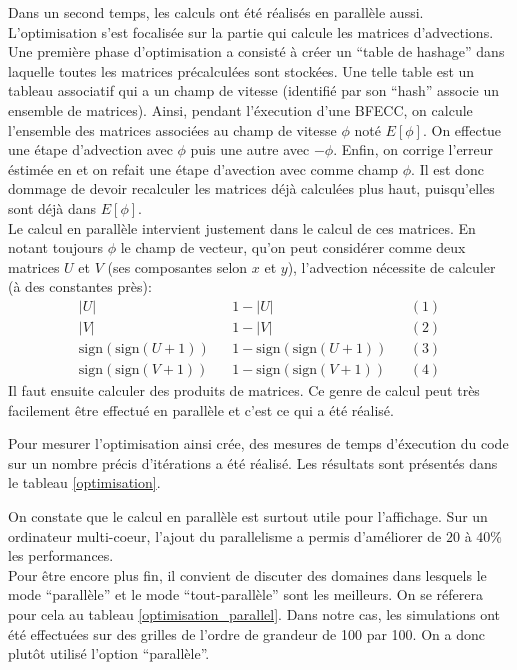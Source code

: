 Dans un second temps, les calculs ont été réalisés en parallèle
aussi. L'optimisation s'est focalisée sur la partie qui calcule les
matrices d'advections. Une première phase d'optimisation a consisté à
créer un ``table de hashage'' dans laquelle toutes les matrices
précalculées sont stockées. Une telle table est un tableau associatif
qui a un champ de vitesse (identifié par son ``hash'' associe un
ensemble de matrices). Ainsi, pendant l'éxecution d'une BFECC,
on calcule l'ensemble des matrices associées au champ de vitesse
$\phi$ noté $E[\phi]$. On effectue une étape d'advection avec $\phi$
puis une autre avec $-\phi$. Enfin, on corrige l'erreur éstimée en
et on refait une étape d'avection avec comme champ $\phi$. Il est donc
dommage de devoir recalculer les matrices déjà calculées plus haut,
puisqu'elles sont déjà dans $E[\phi]$.\\
Le calcul en parallèle intervient justement dans le calcul de ces
matrices. En notant toujours $\phi$ le champ de vecteur, qu'on peut
considérer comme deux matrices $U$ et $V$ (ses composantes selon $x$
et $y$), l'advection nécessite de calculer (à des constantes près): 
\begin{align*}
  \left| U \right | & &  1 - \left| U \right | & &(1)\\
  \left| V \right | & &  1 - \left| V \right | & &(2)\\
  \textrm{sign}\left( \textrm{sign}(U+1)\right) & &   1 -
  \textrm{sign}\left( \textrm{sign}(U+1)\right) & &(3)\\
  \textrm{sign}\left( \textrm{sign}(V+1)\right) & &   1 -
  \textrm{sign}\left( \textrm{sign}(V+1)\right) & &(4)
\end{align*} 
Il faut ensuite calculer des produits de matrices. Ce genre de calcul
peut très facilement être effectué en parallèle et c'est ce qui a été
réalisé.
 
Pour mesurer l'optimisation ainsi crée, des mesures de temps
d'éxecution du code sur un nombre précis d'itérations a été
réalisé. Les résultats sont présentés dans le tableau
\ref{optimisation}.

On constate que le calcul en parallèle est surtout utile pour
l'affichage. Sur un ordinateur multi-coeur, l'ajout du parallelisme a
permis d'améliorer de $20$ à $40\%$ les performances.\\
Pour être encore plus fin, il convient de discuter des domaines dans
lesquels le mode ``parallèle'' et le mode ``tout-parallèle'' sont les
meilleurs. On se réferera pour cela au tableau
\ref{optimisation_parallel}. Dans notre cas, les simulations ont été
effectuées sur des grilles de l'ordre de grandeur de 100 par 100. On a
donc plutôt utilisé l'option ``parallèle''.

